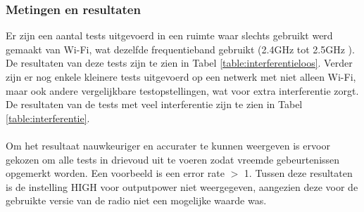 \documentclass{article}
\begin{document}
\subsubsection{Metingen en resultaten}
Er zijn een aantal tests uitgevoerd in een ruimte waar slechts gebruikt werd gemaakt van Wi-Fi, wat dezelfde frequentieband gebruikt (2.4GHz tot 2.5GHz \cite{wifi}). De resultaten van deze tests zijn te zien in Tabel \ref{table:interferentieloos}. Verder zijn er nog enkele kleinere tests uitgevoerd op een netwerk met niet alleen Wi-Fi, maar ook andere vergelijkbare testopstellingen, wat voor extra interferentie zorgt. De resultaten van de tests met veel interferentie zijn te zien in Tabel \ref{table:interferentie}. \\
\\
Om het resultaat nauwkeuriger en accurater te kunnen weergeven is ervoor gekozen om alle tests in drievoud uit te voeren zodat vreemde gebeurtenissen opgemerkt worden. Een voorbeeld is een error rate $>$ 1. Tussen deze resultaten is de instelling HIGH voor outputpower niet weergegeven, aangezien deze voor de gebruikte versie van de radio niet een mogelijke waarde was.
\end{document}
